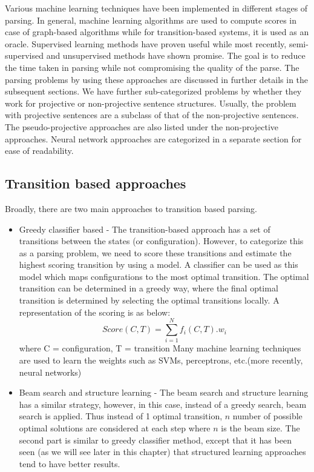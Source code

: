 Various machine learning techniques have been implemented in different stages of parsing. In general, machine learning algorithms are used to compute scores in case of graph-based algorithms while for transition-based systems, it is used as an oracle. Supervised learning methods have proven useful while most recently, semi-supervised and unsupervised methods have shown promise. The goal is to reduce the time taken in parsing while not compromising the quality of the parse. 
The parsing problems by using these approaches are discussed in further details in the subsequent sections. We have further sub-categorized problems by whether they work for projective or non-projective sentence structures. Usually, the problem with projective sentences are a subclass of that of the non-projective sentences. The pseudo-projective approaches are also listed under the non-projective approaches. Neural network approaches are categorized in a separate section for ease of readability.

\subsection{Transition based approaches}

Broadly, there are two main approaches to transition based parsing. 

\begin{itemize}
\item Greedy classifier based - The transition-based approach has a set of transitions between the states (or configuration). However, to categorize this as a parsing problem, we need to score these transitions and estimate the highest scoring transition by using a model. A classifier can be used as this model which maps configurations to the most optimal transition. The optimal transition can be determined in a greedy way, where the final optimal transition is determined by selecting the optimal transitions locally. A representation of the scoring is as below:
\begin{equation*}
Score(C, T) = \sum_{i = 1}^{N} f_i(C,T).w_i
\end{equation*}
where C = configuration, T = transition
Many machine learning techniques are used to learn the weights such as SVMs, perceptrons, etc.(more recently, neural networks)

\item Beam search and structure learning - The beam search and structure learning has a similar strategy, however, in this case, instead of a greedy search, beam search is applied. Thus instead of 1 optimal transition, $n$ number of possible optimal solutions are considered at each step where $n$ is the beam size. The second part is similar to greedy classifier method, except that it has been seen (as we will see later in this chapter) that structured learning approaches tend to have better results.
\end{itemize}

